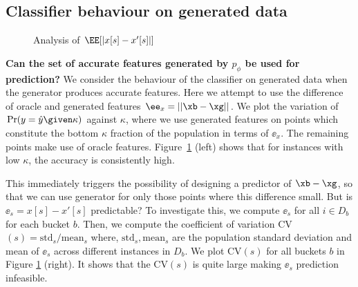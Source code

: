 \documentclass[letterpaper]{article}
\begin{document}
\subsection{Classifier behaviour on generated data}
\begin{figure}[h]
    \centering
 \vspace{-3mm}
        \caption{\small Analysis of $\EE[|x[s]-x'[s]|]$ }
    \label{fig:lm}
\end{figure}
\textbf{Can the set of accurate features generated by $p_{\phi}$ be used for prediction?}
We consider the behaviour of the classifier on generated data when the generator produces accurate features.
Here we attempt to use the difference of oracle and generated features $\ee_x= ||\xb-\xg||$. We plot the variation of $\Pr(y=\hat{y} \given \kappa)$ against $\kappa$, where we use generated features on points which constitute the bottom $\kappa$ fraction of the population in terms of $\ee_x$. The remaining points make use of oracle features. Figure~\ref{fig:lm} (left) shows that for instances with low $\kappa$, the accuracy is consistently high. 

This immediately triggers the possibility of designing a predictor of $\xb - \xg$, so that we can use generator for only those points where this difference small. But is  $\ee_s = x[s] - x'[s]$ predictable?  To investigate this, we compute $\ee_s$ for all $i\in D_b$ for each bucket $b$. Then, we compute the coefficient of variation CV$(s) = \text{std}_s/\text{mean}_s$ where, 
$\text{std}_s, \text{mean}_s$ are the population standard deviation and mean of $\ee_s$ across different
instances in $ D_b$. We plot CV$(s)$  for all buckets $b$ in Figure \ref{fig:lm} (right). It shows that the CV$(s)$ is quite large making $\ee_s$ prediction infeasible.
\end{document}
